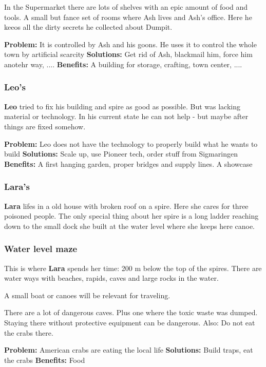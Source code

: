 In the Supermarket there are lots of shelves with an epic amount of food and tools. A small but fance set of rooms where Ash lives and Ash's office. Here he keeos all the dirty secrets he collected about Dumpit.

\textbf{Problem:} It is controlled by Ash and his goons. He uses it to control the whole town by artificial scarcity
\textbf{Solutions:} Get rid of Ash, blackmail him, force him anotehr way, ....
\textbf{Benefits:} A building for storage, crafting, town center, ....

\subsubsection{Leo's}

\textbf{Leo} tried to fix his building and spire as good as possible. But was lacking material or technology. In his current state he can not help - but maybe after things are fixed somehow.

\textbf{Problem:} Leo does not have the technology to properly build what he wants to build
\textbf{Solutions:} Scale up, use Pioneer tech, order stuff from Sigmaringen
\textbf{Benefits:} A first hanging garden, proper bridges and supply lines. A showcase

\subsubsection{Lara's}

\textbf{Lara} lifes in a old house with broken roof on a spire. Here she cares for three poisoned people. The only special thing about her spire is a long ladder reaching down to the small dock she built at the water level where she keeps here canoe.

\subsubsection{Water level maze}

This is where \textbf{Lara} spends her time: 200 m below the top of the spires. There are water ways with beaches, rapids, caves and large rocks in the water.

A small boat or canoes will be relevant for traveling.

There are a lot of dangerous caves. Plus one where the toxic waste was dumped. Staying there without protective equipment can be dangerous. Also: Do not eat the crabs there.

\textbf{Problem:} American crabs are eating the local life
\textbf{Solutions:} Build traps, eat the crabs
\textbf{Benefits:} Food


